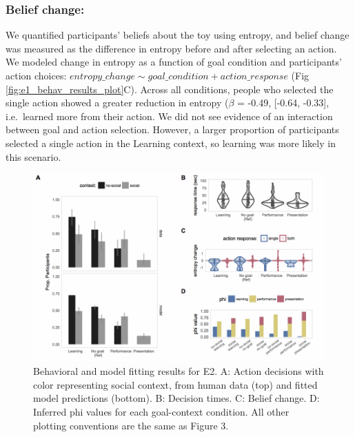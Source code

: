 \documentclass[10pt, letterpaper]{article}
\newenvironment{CodeChunk}{}{}
\begin{document}
\subsubsection{Belief change:}\label{belief-change}

We quantified participants' beliefs about the toy using entropy, and
belief change was measured as the difference in entropy before and after
selecting an action. We modeled change in entropy as a function of goal
condition and participants' action choices:
\texttt{$entropy\_change \sim goal\_condition + action\_response$} (Fig
\ref{fig:e1_behav_results_plot}C). Across all conditions, people who
selected the single action showed a greater reduction in entropy
(\(\beta\) = -0.49, {[}-0.64, -0.33{]}, i.e.~learned more from their
action. We did not see evidence of an interaction between goal and
action selection. However, a larger proportion of participants selected
a single action in the Learning context, so learning was more likely in
this scenario.

\begin{CodeChunk}
\begin{figure}[tb]

{\centering \includegraphics[width=0.95\linewidth]{figs/e2_results-1} 

}

\caption[Behavioral and model fitting results for E2]{Behavioral and model fitting results for E2. A: Action decisions with color representing social context, from human data (top) and fitted model predictions (bottom). B: Decision times. C: Belief change. D: Inferred phi values for each goal-context condition. All other plotting conventions are the same as Figure 3.}\label{fig:e2_results}
\end{figure}
\end{CodeChunk}
\end{document}
